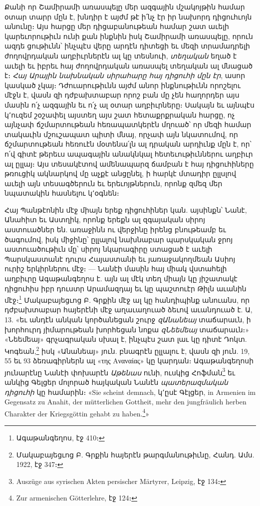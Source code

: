 \documentclass{article}
\begin{document}
{Քանի որ Շամիրամի առասպելը մեր ազգային մշակոյթին համար օտար տարր մըն է, խնդիր է այժմ թէ ի՛նչ էր իր նախորդ դիցուհւոյն անունը։ Այս հարցը մեր դիցաբանութեան համար շատ աւելի կարեւորութիւն ունի քան ինքնին իսկ Շամիրամի առասպելը, որուն ազդե ցութիւնն՝ ինչպէս վերը արդէն դիտեցի եւ մեզի տրամադրելի ժողովրդական աղբիւրներէն ալ կը տեսնուի, \emph{տեղական} եղած է աւելի եւ իբրեւ հայ ժողովրդական առասպել տեղական ալ մնացած է։ \emph{Հայ Արային նախնական սիրահարը հայ դիցուհի մըն էր}, ասոր կասկած չկայ։ Դժուարութիւնն այժմ անոր ինքնութիւնն որոշելու մէջն է, վասն զի դժբախտաբար որոշ բան մը չեն հաղորդեր այս մասին ո՛չ ազգային եւ ո՛չ ալ օտար աղբիւրները։ Սակայն եւ այնպէս կ՚ուզեմ շօշափել այստեղ այս շատ հետաքրքրական հարցը, ոչ այնչափ ճշմարտութեան հեռապատկերէն մղուած՝ որ մեզի համար տակաւին մշուշապատ պիտի մնայ, որչափ այն նկատումով, որ ճշմարտութեան հեռուէն մօտենա՛լն ալ դրական արդիւնք մըն է, որ՝ ո՛վ գիտէ թերեւս ապագային անակնկալ հետեւութիւններու աղբիւր ալ ըլլայ։ Այս տեսակէտով ամենապարզ ճամբան է հայ դիցուհիները թռուցիկ ակնարկով մը աչքէ անցընել, ի հարկէ մտադիր ըլլսլով աւելի այն տեսագծերուն եւ երեւոյթներուն, որոնք զմեզ մեր նպատակին հասնելու կ՚օգնեն։

Հայ Պանթէոնին մէջ միայն երեք դիցուհիներ կան. այսինքն՝ Նանէ, Անահիտ եւ Աստղիկ, որոնք երեքն ալ զգայական սիրոյ աստուածներ են. առաջինն ու վերջինը իրենց բնութեամբ եւ ծագումով, իսկ միջինը՝ ըլլալով նախնաբար պարսկական ջրոյ աստուածութիւն մը՝ սիրոյ նկարագիրը ստացած է աւելի Պարսկաստանէ դուրս Հայաստանի եւ յառաջակողմեան Ասիոյ ուրիշ երկիրներու մէջ։ — Նանէի մասին հայ միակ վստահելի աղբիւրը Ագաթանգեղոս է. այն ալ մէկ տեղ միայն կը յիշատակէ դիցուհիս իբր դուստր Արամազդայ եւ կը պաշտուէր Թիլն աւանին մէջ։\footnote{Ագաթանգեղոս, էջ 410։} Մակաբայեցւոց Բ. Գրքին մէջ ալ կը հանդիպինք անուանս, որ դժբախտաբար հայերէնի մէջ աղաւաղուած ձեւով աւանդուած է. Ա, 13. «եւ անդէն անկան կործանեցան շուրջ \emph{զԱնանեայ} տաճարաւն, ի խորհուրդ յիմարութեան խորհեցան նոքա \emph{զՆեեմեայ} տաճարաւն։» «Նեեմեայ» գրչագրական սխալ է, ինչպէս շատ լաւ կը դիտէ Դոկտ. Կոգեան,\footnote{Մակաբայեցւոց Բ. Գրքին հայերէն թարգմանութիւնը, Հանդ. Ամս. 1922, էջ 347։} իսկ «Անանեայ» յուն. բնագրէն ըլլալու է, վասն զի յուն. 19, 55 եւ 93 ձեռագիրներն ալ «της Αναναίας» կը կարդան։ Ագաթանգեղոսի յունարէնը Նանէի փոխարէն \emph{Աթենաս} ունի, ուսկից Հոֆման\footnote{Auszüge aus syrischen Akten persischer Märtyrer, Leipzig, էջ 134։} եւ անկից Գելցեր մոլորած հայկական Նանէն \emph{պատերազմական դիցուհի} կը համարին։ «Sie scheint demnach, կ՚ըսէ Գէլցեր, in Armenien im Gegensatz zu Anahit, der mütterlichen Gottheit, mehr den jungfräulich herben Charakter der Kriegsgöttin gehabt zu haben.\footnote{Zur armenischen Götterlehre, էջ 124։}»

}
\end{document}
